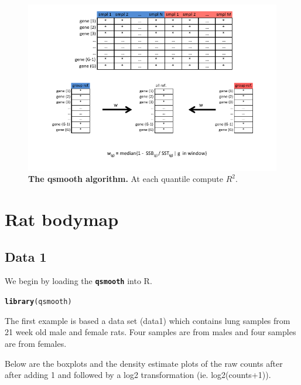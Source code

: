 \documentclass{article}\usepackage[]{graphicx}\usepackage[usenames,dvipsnames]{color}
\makeatletter
\newcommand{\hlstd}[1]{\textcolor[rgb]{0.345,0.345,0.345}{#1}}%
\newcommand{\hlkwd}[1]{\textcolor[rgb]{0.737,0.353,0.396}{\textbf{#1}}}%
\newenvironment{kframe}{%
 \def\at@end@of@kframe{}%
 \ifinner\ifhmode%
  \def\at@end@of@kframe{\end{minipage}}%
  \begin{minipage}{\columnwidth}%
 \fi\fi%
 \def\FrameCommand##1{\hskip\@totalleftmargin \hskip-\fboxsep
 \colorbox{shadecolor}{##1}\hskip-\fboxsep
     \hskip-\linewidth \hskip-\@totalleftmargin \hskip\columnwidth}%
 \MakeFramed {\advance\hsize-\width
   \@totalleftmargin\z@ \linewidth\hsize
   \@setminipage}}%
 {\par\unskip\endMakeFramed%
 \at@end@of@kframe}
\newenvironment{knitrout}{}{} %
\makeatother
\begin{document}
\begin{figure}[!h]
\begin{center}
\includegraphics[width=\columnwidth]{qsmooth_algo.pdf}
\end{center}
\small\normalsize
\caption[qsmooth algorithm]
         {{\bf The qsmooth algorithm.} 
          At each quantile compute $R^2$.}
\label{algo}
\end{figure}

\newpage
\section{Rat bodymap}

\subsection{Data 1}

We begin by loading the \texttt{\bf{qsmooth}} into R. 

\begin{knitrout}
\color{fgcolor}\begin{kframe}
\begin{alltt}
\hlkwd{library}\hlstd{(qsmooth)}
\end{alltt}
\end{kframe}
\end{knitrout}

The first example is based a data set (data1)
which contains lung samples from 21 week old male and female rats. 
Four samples are from males and four samples are from females.



Below are the boxplots and the density estimate plots
of the raw counts after after adding 1 and 
followed by a log2 transformation (ie. log2(counts+1)).
\end{document}
